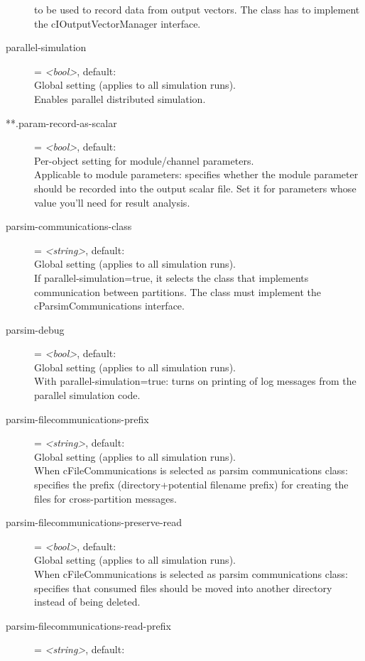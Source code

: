 \begin{description}
    to be used to record data from output vectors. The class has to implement
    the cIOutputVectorManager interface.
\item[parallel-simulation] = \textit{<bool>}, default: \\
    Global setting (applies to all simulation runs).\\
    Enables parallel distributed simulation.
\item[**.param-record-as-scalar] = \textit{<bool>}, default: \\
    Per-object setting for module/channel parameters.\\
    Applicable to module parameters: specifies whether the module parameter
    should be recorded into the output scalar file. Set it for parameters whose
    value you'll need for result analysis.
\item[parsim-communications-class] = \textit{<string>}, default: \\
    Global setting (applies to all simulation runs).\\
    If parallel-simulation=true, it selects the class that implements
    communication between partitions. The class must implement the
    cParsimCommunications interface.
\item[parsim-debug] = \textit{<bool>}, default: \\
    Global setting (applies to all simulation runs).\\
    With parallel-simulation=true: turns on printing of log messages from the
    parallel simulation code.
\item[parsim-filecommunications-prefix] = \textit{<string>}, default: \\
    Global setting (applies to all simulation runs).\\
    When cFileCommunications is selected as parsim communications class:
    specifies the prefix (directory+potential filename prefix) for creating the
    files for cross-partition messages.
\item[parsim-filecommunications-preserve-read] = \textit{<bool>}, default: \\
    Global setting (applies to all simulation runs).\\
    When cFileCommunications is selected as parsim communications class:
    specifies that consumed files should be moved into another directory
    instead of being deleted.
\item[parsim-filecommunications-read-prefix] = \textit{<string>}, default: \\

\end{description}
